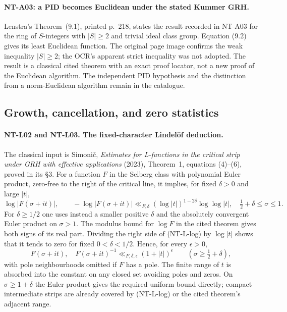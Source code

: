 \documentclass[11pt,a4paper]{article}
\begin{document}
\paragraph{NT-A03: a PID becomes Euclidean under the stated Kummer GRH.}
Lenstra's Theorem~(9.1), printed p.~218, states the result recorded in
NT-A03 for the ring of $S$-integers with $|S|\ge2$ and trivial ideal
class group.  Equation (9.2) gives its least Euclidean function.
The original page image confirms the weak inequality $|S|\ge2$;
the OCR's apparent strict inequality was not adopted.  The result is a
classical cited theorem with an exact proof locator, not a new proof of
the Euclidean algorithm.  The independent PID hypothesis and the
distinction from a norm-Euclidean algorithm remain in the catalogue.

\subsection{Growth, cancellation, and zero statistics}

\paragraph{NT-L02 and NT-L03. The fixed-character Lindel\"of deduction.}
The classical input is Simoni\v c, \emph{Estimates for L-functions in the
critical strip under GRH with effective applications} (2023), Theorem~1,
equations (4)--(6), proved in its \S3.  For a function $F$ in the Selberg
class with polynomial Euler product, zero-free to the right of the
critical line, it implies, for fixed $\delta>0$ and large $|t|$,
\[
 \log|F(\sigma+it)|,\qquad -\log|F(\sigma+it)|
 \ll_{F,\delta}(\log|t|)^{1-2\delta}\log\log|t|,
 \quad \tfrac12+\delta\le\sigma\le1.
\tag{NT-L-log}
\]
For $\delta\ge1/2$ one uses instead a smaller positive $\delta$ and
the absolutely convergent Euler product on $\sigma>1$.
The modulus bound for $\log F$ in the cited theorem gives both signs of
its real part.  Dividing the right side of (NT-L-log) by $\log|t|$
shows that it tends to zero for fixed $0<\delta<1/2$.  Hence, for every
$\epsilon>0$,
\[
 F(\sigma+it),\quad F(\sigma+it)^{-1}
 \ll_{F,\delta,\epsilon}(1+|t|)^\epsilon
 \qquad(\sigma\ge\tfrac12+\delta),
\tag{NT-L-right}
\]
with pole neighbourhoods omitted if $F$ has a pole.  The finite range of
$t$ is absorbed into the constant on any closed set avoiding poles and
zeros.  On $\sigma\ge1+\delta$ the Euler product gives the required
uniform bound directly; compact intermediate strips are already covered
by (NT-L-log) or the cited theorem's adjacent range.
\end{document}

